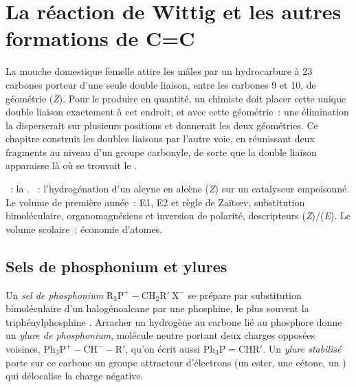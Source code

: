 \chapter{La réaction de Wittig et les autres formations de C=C}\label{ch:b2:wittig}

La mouche domestique femelle attire les mâles par un hydrocarbure à 23 carbones porteur d'une seule
double liaison, entre les carbones 9 et 10, de géométrie (\textit{Z}). Pour le produire en quantité,
un chimiste doit placer cette unique double liaison exactement à cet endroit, et avec cette
géométrie~: une élimination la disperserait sur plusieurs positions et donnerait les deux géométries.
Ce chapitre construit les doubles liaisons par l'autre voie, en réunissant deux fragments au niveau
d'un groupe carbonyle, de sorte que la double liaison apparaisse là où se trouvait le .

\begin{recall}
~: la . ~: l'hydrogénation d'un
alcyne en alcène (\textit{Z}) sur un catalyseur empoisonné. Le volume de première année~: E1, E2 et
règle de Zaïtsev, substitution bimoléculaire, organomagnésiens et inversion de polarité, descripteurs
(\textit{Z})/(\textit{E}). Le volume scolaire~: économie d'atomes.
\end{recall}

\section{Sels de phosphonium et ylures}

\begin{definition}\label{def:b2:wittig:ylide}
Un \emph{sel de phosphonium} $\mathrm{R_3P^+{-}CH_2R'\ X^-}$ se prépare par
substitution bimoléculaire d'un halogénoalcane par une phosphine, le plus souvent la triphénylphosphine
. Arracher un hydrogène au carbone lié au phosphore donne un \emph{ylure de phosphonium},
molécule neutre portant deux charges opposées voisines, $\mathrm{Ph_3P^+{-}CH^-{-}R'}$, qu'on écrit aussi
$\mathrm{Ph_3P{=}CHR'}$. Un \emph{ylure stabilisé} porte sur ce
carbone un groupe attracteur d'électrons (un ester, une cétone, un ) qui délocalise la charge
négative.
\end{definition}

